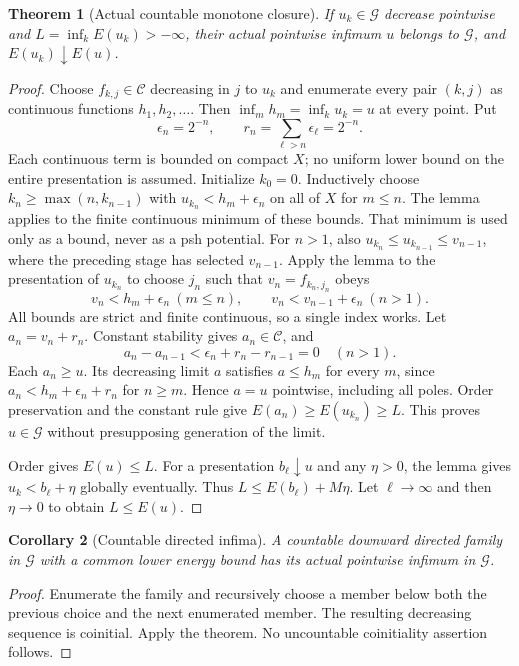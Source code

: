 \documentclass[11pt]{article}
\newtheorem{theorem}{Theorem}
\newtheorem{corollary}[theorem]{Corollary}
\newcommand{\C}{\mathcal C}
\newcommand{\G}{\mathcal G}
\begin{document}
\begin{theorem}[Actual countable monotone closure]
If $u_k\in\G$ decrease pointwise and $L=\inf_kE(u_k)>-\infty$, their actual
pointwise infimum $u$ belongs to $\G$, and $E(u_k)\downarrow E(u)$.
\end{theorem}
\begin{proof}
Choose $f_{k,j}\in\C$ decreasing in $j$ to $u_k$ and enumerate every pair
$(k,j)$ as continuous functions $h_1,h_2,\ldots$. Then
$\inf_mh_m=\inf_ku_k=u$ at every point. Put
\[
 \epsilon_n=2^{-n},\qquad r_n=\sum_{\ell>n}\epsilon_\ell=2^{-n}.
\]
Each continuous term is bounded on compact $X$; no uniform lower bound on
the entire presentation is assumed. Initialize $k_0=0$.
Inductively choose $k_n\geq\max(n,k_{n-1})$ with
$u_{k_n}<h_m+\epsilon_n$ on all of $X$ for $m\leq n$.
The lemma applies to the finite continuous minimum of these bounds.
That minimum is used only as a bound, never as a psh potential.
For $n>1$, also $u_{k_n}\leq u_{k_{n-1}}\leq v_{n-1}$, where the preceding
stage has selected $v_{n-1}$. Apply the lemma to the presentation of $u_{k_n}$
to choose $j_n$ such that $v_n=f_{k_n,j_n}$ obeys
\[
 v_n<h_m+\epsilon_n\ (m\leq n),\qquad
 v_n<v_{n-1}+\epsilon_n\ (n>1).
\]
All bounds are strict and finite continuous, so a single index works.
Let $a_n=v_n+r_n$. Constant stability gives $a_n\in\C$, and
\[
 a_n-a_{n-1}<\epsilon_n+r_n-r_{n-1}=0\quad(n>1).
\]
Each $a_n\geq u$. Its decreasing limit $a$ satisfies $a\leq h_m$ for every
$m$, since $a_n<h_m+\epsilon_n+r_n$ for $n\geq m$.
Hence $a=u$ pointwise, including all poles.
Order preservation and the constant rule give
$E(a_n)\geq E(u_{k_n})\geq L$. This proves $u\in\G$ without presupposing
generation of the limit.

Order gives $E(u)\leq L$. For a presentation $b_\ell\downarrow u$ and any
$\eta>0$, the lemma gives $u_k<b_\ell+\eta$ globally eventually.
Thus $L\leq E(b_\ell)+M\eta$. Let $\ell\to\infty$ and then
$\eta\to0$ to obtain $L\leq E(u)$.
\end{proof}

\begin{corollary}[Countable directed infima]
A countable downward directed family in $\G$ with a common lower energy
bound has its actual pointwise infimum in $\G$.
\end{corollary}
\begin{proof}
Enumerate the family and recursively choose a member below both the previous
choice and the next enumerated member. The resulting decreasing sequence is
coinitial. Apply the theorem. No uncountable coinitiality assertion follows.
\end{proof}
\end{document}
